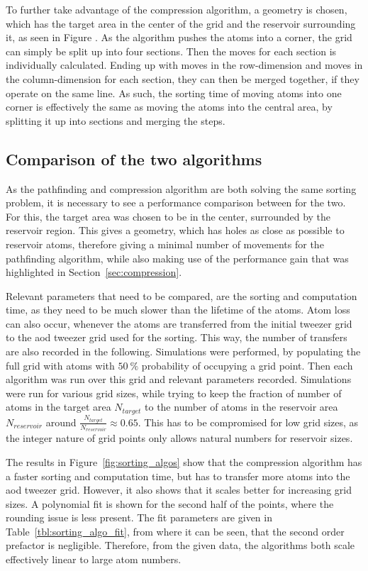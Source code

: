 To further take advantage of the compression algorithm, a geometry is chosen, which has the target area in the center of the grid and the reservoir surrounding it, as seen in Figure . As the algorithm pushes the atoms into a corner, the grid can simply be split up into four sections. Then the moves for each section is individually calculated. Ending up with moves in the row-dimension and moves in the column-dimension for each section, they can then be merged together, if they operate on the same line. As such, the sorting time of moving atoms into one corner is effectively the same as moving the atoms into the central area, by splitting it up into sections and merging the steps.

\subsection{Comparison of the two algorithms}

As the pathfinding and compression algorithm are both solving the same sorting problem, it is necessary to see a performance comparison between for the two. For this, the target area was chosen to be in the center, surrounded by the reservoir region. This gives a geometry, which has holes as close as possible to reservoir atoms, therefore giving a minimal number of movements for the pathfinding algorithm, while also making use of the performance gain that was highlighted in Section~\ref{sec:compression}.

Relevant parameters that need to be compared, are the sorting and computation time, as they need to be much slower than the lifetime of the atoms. Atom loss can also occur, whenever the atoms are transferred from the initial tweezer grid to the \ac{aod} tweezer grid used for the sorting. This way, the number of transfers are also recorded in the following.
Simulations were performed, by populating the full grid with atoms with $\SI{50}{\percent}$ probability of occupying a grid point. Then each algorithm was run over this grid and relevant parameters recorded. Simulations were run for various grid sizes, while trying to keep the fraction of number of atoms in the target area $N_{target}$ to the number of atoms in the reservoir area $N_{reservoir}$ around $\frac{N_{target}}{N_{reservoir}} \approx 0.65$. This has to be compromised for low grid sizes, as the integer nature of grid points only allows natural numbers for reservoir sizes.

The results in Figure~\ref{fig:sorting_algos} show that the compression algorithm has a faster sorting and computation time, but has to transfer more atoms into the \ac{aod} tweezer grid. However, it also shows that it scales better for increasing grid sizes. A polynomial fit is shown for the second half of the points, where the rounding issue is less present. The fit parameters are given in Table~\ref{tbl:sorting_algo_fit}, from where it can be seen, that the second order prefactor is negligible. Therefore, from the given data, the algorithms both scale effectively linear to large atom numbers.

